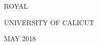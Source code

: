 \begin{titlepage}

	\begin{center}
		\fontsize{14}{12}\MakeUppercase{Royal}
	\end{center}

	\vspace*{0.5cm}

	\begin{center}
		\fontsize{16}{12}\MakeUppercase{UNIVERSITY OF CALICUT}
	\end{center}

	\vspace*{0.5cm}

	\begin{center}
		\fontsize{14}{12}\MakeUppercase{MAY 2018}
	\end{center}


	
	\vspace{-.5cm}
	\setcounter{page}{0}
	\pagebreak

\end{titlepage}
